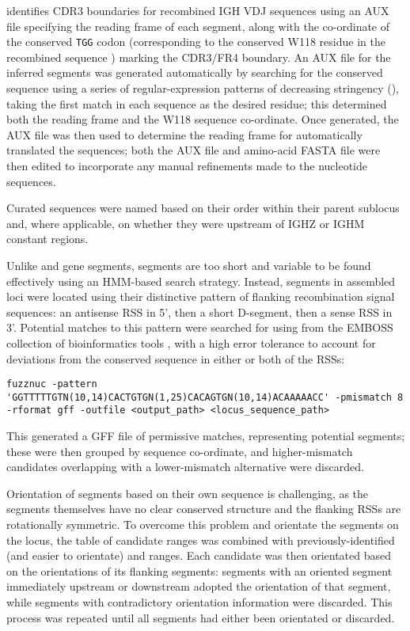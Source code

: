  \parencite{ye2013igblast} identifies CDR3 boundaries for recombined IGH VDJ sequences using an AUX file specifying the reading frame of each \jh segment, along with the co-ordinate of the conserved \texttt{TGG} codon (corresponding to the conserved W118 residue in the recombined sequence \parencite{lefranc2014immunoglobulins}) marking the CDR3/FR4 boundary. An AUX file for the inferred \jh segments was generated automatically by searching for the conserved sequence using a series of regular-expression patterns of decreasing stringency (), taking the first match in each sequence as the desired residue; this determined both the reading frame and the W118 sequence co-ordinate. Once generated, the AUX file was then used to determine the reading frame for automatically translated the \jh sequences; both the AUX file and amino-acid FASTA file were then edited to incorporate any manual refinements made to the \jh nucleotide sequences.

Curated \jh sequences were named based on their order within their parent sublocus and, where applicable, on whether they were upstream of IGHZ or IGHM constant regions. 

\subsubsubsection{\dh}

Unlike \vh and \jh gene segments, \dh segments are too short and variable to be found effectively using an HMM-based search strategy. Instead, \dh segments in assembled loci were located using their distinctive pattern of flanking recombination signal sequences: an antisense RSS in 5', then a short D-segment, then a sense RSS in 3'. Potential matches to this pattern were searched for using  from the EMBOSS collection of bioinformatics tools \parencite{rice2000emboss}, with a high error tolerance to account for deviations from the conserved sequence in either or both of the RSSs:

\begin{lstlisting}
fuzznuc -pattern 'GGTTTTTGTN(10,14)CACTGTGN(1,25)CACAGTGN(10,14)ACAAAAACC' -pmismatch 8 -rformat gff -outfile <output_path> <locus_sequence_path>
\end{lstlisting}

This generated a GFF file \parencite{stein2010generic} of permissive matches, representing potential \dh segments; these were then grouped by sequence co-ordinate, and higher-mismatch candidates overlapping with a lower-mismatch alternative were discarded.

Orientation of \dh segments based on their own sequence is challenging, as the segments themselves have no clear conserved structure and the flanking RSSs are rotationally symmetric. To overcome this problem and orientate the \dh segments on the locus, the table of \dh candidate ranges was combined with previously-identified (and easier to orientate) \vh and \jh ranges. Each \dh candidate was then orientated based on the orientations of its flanking segments: segments with an oriented segment immediately upstream or downstream adopted the orientation of that segment, while segments with contradictory orientation information were discarded. This process was repeated until all \dh segments had either been orientated or discarded.

